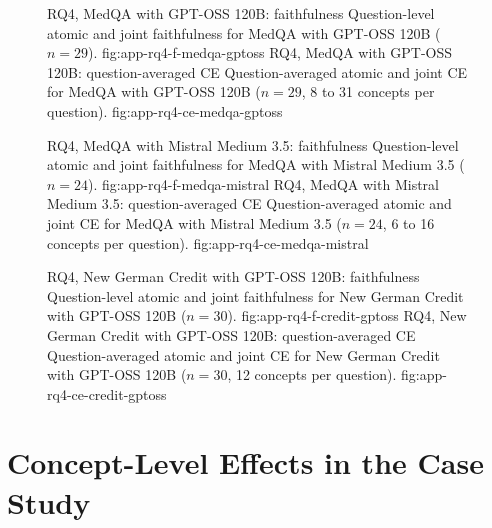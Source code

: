 \begin{figure}[H]
  \centering
    {RQ4, MedQA with GPT-OSS 120B: faithfulness}%
    {Question-level atomic and joint faithfulness for MedQA with GPT-OSS 120B ($n=29$).}%
    {fig:app-rq4-f-medqa-gptoss}%
  \hfill
    {RQ4, MedQA with GPT-OSS 120B: question-averaged CE}%
    {Question-averaged atomic and joint CE for MedQA with GPT-OSS 120B ($n=29$, 8 to 31 concepts per question).}%
    {fig:app-rq4-ce-medqa-gptoss}%
\end{figure}

\begin{figure}[H]
  \centering
    {RQ4, MedQA with Mistral Medium 3.5: faithfulness}%
    {Question-level atomic and joint faithfulness for MedQA with Mistral Medium 3.5 ($n=24$).}%
    {fig:app-rq4-f-medqa-mistral}%
  \hfill
    {RQ4, MedQA with Mistral Medium 3.5: question-averaged CE}%
    {Question-averaged atomic and joint CE for MedQA with Mistral Medium 3.5 ($n=24$, 6 to 16 concepts per question).}%
    {fig:app-rq4-ce-medqa-mistral}%
\end{figure}

\begin{figure}[H]
  \centering
    {RQ4, New German Credit with GPT-OSS 120B: faithfulness}%
    {Question-level atomic and joint faithfulness for New German Credit with GPT-OSS 120B ($n=30$).}%
    {fig:app-rq4-f-credit-gptoss}%
  \hfill
    {RQ4, New German Credit with GPT-OSS 120B: question-averaged CE}%
    {Question-averaged atomic and joint CE for New German Credit with GPT-OSS 120B ($n=30$, 12 concepts per question).}%
    {fig:app-rq4-ce-credit-gptoss}%
\end{figure}

\section{Concept-Level Effects in the Case Study}
\label{app:case-study-identity}

